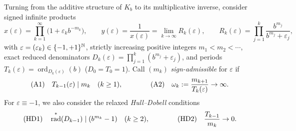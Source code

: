 \documentclass[11pt]{article}
\DeclareMathOperator{\ord}{ord}
\DeclareMathOperator{\rad}{rad}
\begin{document}
Turning from the additive structure of $K_b$ to its multiplicative inverse, consider signed infinite products
\begin{equation}\label{eq:signed-prod}
x(\varepsilon)=\prod_{k=1}^\infty\bigl(1+\varepsilon_k b^{-m_k}\bigr),\qquad
y(\varepsilon)=\frac1{x(\varepsilon)}=\lim_{k\to\infty}R_k(\varepsilon),\qquad
R_k(\varepsilon)=\prod_{j=1}^k\frac{b^{m_j}}{b^{m_j}+\varepsilon_j},
\end{equation}
with $\varepsilon=(\varepsilon_k)\in\{-1,+1\}^{\mathbb N}$, strictly increasing positive integers $m_1<m_2<\cdots$, exact reduced denominators $D_k(\varepsilon)=\prod_{j=1}^k(b^{m_j}+\varepsilon_j)$, and periods $T_k(\varepsilon)=\ord_{D_k(\varepsilon)}(b)$ ($D_0=T_0=1$). Call $(m_k)$ \emph{sign-admissible} for $\varepsilon$ if
\begin{equation}\label{eq:admissible}
\textup{(A1)}\quad T_{k-1}(\varepsilon)\mid m_k\quad(k\ge1),\qquad\qquad
\textup{(A2)}\quad \omega_k:=\frac{m_{k+1}}{T_k(\varepsilon)}\to\infty.
\end{equation}
For $\varepsilon\equiv-1$, we also consider the relaxed \emph{Hull--Dobell} conditions
\begin{equation}\label{eq:HD}
\textup{(HD1)}\quad \rad^*(D_{k-1})\mid(b^{m_k}-1)\quad(k\ge2),\qquad\qquad
\textup{(HD2)}\quad \frac{T_{k-1}}{m_k}\to0.
\end{equation}
\end{document}
